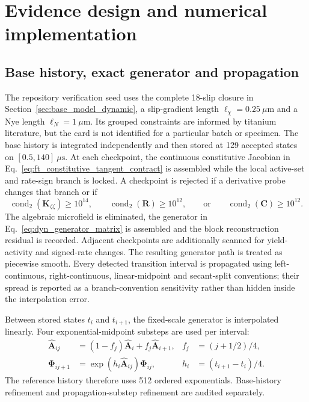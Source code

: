 \section{Evidence design and numerical implementation}
\label{sec:numerical_dynamic}

\subsection{Base history, exact generator and propagation}

The repository verification seed uses the complete 18-slip closure in Section~\ref{sec:base_model_dynamic}, a slip-gradient length $\ell_\chi=0.25~\mu\mathrm m$ and a Nye length $\ell_N=1~\mu\mathrm m$. Its grouped constraints are informed by titanium literature, but the card is not identified for a particular batch or specimen. The base history is integrated independently and then stored at 129 accepted states on $[0.5,140]~\mu\mathrm s$. At each checkpoint, the continuous constitutive Jacobian in Eq.~\eqref{eq:ft_constitutive_tangent_contract} is assembled while the local active-set and rate-sign branch is locked. A checkpoint is rejected if a derivative probe changes that branch or if
\begin{equation}
 \operatorname{cond}_2(\boldsymbol K_{\zeta\zeta})\ge10^{14},
 \qquad
 \operatorname{cond}_2(\boldsymbol R)\ge10^{12},
 \qquad\text{or}\qquad
 \operatorname{cond}_2(\boldsymbol C)\ge10^{12}.
 \label{eq:dyn_conditioning_gates}
\end{equation}
The algebraic microfield is eliminated, the generator in Eq.~\eqref{eq:dyn_generator_matrix} is assembled and the block reconstruction residual is recorded. Adjacent checkpoints are additionally scanned for yield-activity and signed-rate changes. The resulting generator path is treated as piecewise smooth. Every detected transition interval is propagated using left-continuous, right-continuous, linear-midpoint and secant-split conventions; their spread is reported as a branch-convention sensitivity rather than hidden inside the interpolation error.

Between stored states $t_i$ and $t_{i+1}$, the fixed-scale generator is interpolated linearly. Four exponential-midpoint substeps are used per interval:
\begin{align}
 \widehat{\boldsymbol A}_{ij}
 &=(1-f_j)\widehat{\boldsymbol A}_i+f_j\widehat{\boldsymbol A}_{i+1},
 &f_j&=(j+1/2)/4,\\
 \boldsymbol\Phi_{ij+1}
 &=\exp(h_i\widehat{\boldsymbol A}_{ij})\boldsymbol\Phi_{ij},
 &h_i&=(t_{i+1}-t_i)/4.
 \label{eq:ft_midpoint_product}
\end{align}
The reference history therefore uses 512 ordered exponentials. Base-history refinement and propagation-substep refinement are audited separately.

